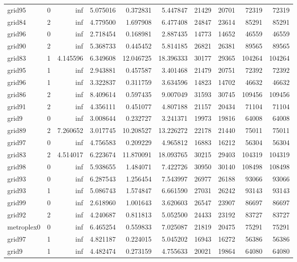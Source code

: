 \begin{longtable}{|l|r|r|r|r|r|r|r|r|r|}
grid95 & 0 & inf & 5.075016 & 0.372831 & 5.447847 & 21429 & 20701 & 72319 & 72319 \\
grid84 & 2 & inf & 4.779500 & 1.697908 & 6.477408 & 24847 & 23614 & 85291 & 85291 \\
grid96 & 0 & inf & 2.718454 & 0.168981 & 2.887435 & 14773 & 14652 & 46559 & 46559 \\
grid90 & 2 & inf & 5.368733 & 0.445452 & 5.814185 & 26821 & 26381 & 89565 & 89565 \\
grid83 & 1 & 4.145596 & 6.349608 & 12.046725 & 18.396333 & 30177 & 29365 & 104264 & 104264 \\
grid95 & 1 & inf & 2.943881 & 0.457587 & 3.401468 & 21479 & 20751 & 72392 & 72392 \\
grid96 & 1 & inf & 3.322837 & 0.311759 & 3.634596 & 14823 & 14702 & 46632 & 46632 \\
grid86 & 2 & inf & 8.409614 & 0.597435 & 9.007049 & 31593 & 30745 & 109456 & 109456 \\
grid91 & 2 & inf & 4.356111 & 0.451077 & 4.807188 & 21157 & 20434 & 71104 & 71104 \\
grid9 & 0 & inf & 3.008644 & 0.232727 & 3.241371 & 19973 & 19816 & 64008 & 64008 \\
grid89 & 2 & 7.260652 & 3.017745 & 10.208527 & 13.226272 & 22178 & 21440 & 75011 & 75011 \\
grid97 & 0 & inf & 4.756583 & 0.209229 & 4.965812 & 16883 & 16212 & 56304 & 56304 \\
grid83 & 2 & 4.514017 & 6.223674 & 11.870091 & 18.093765 & 30215 & 29403 & 104319 & 104319 \\
grid98 & 0 & inf & 5.938655 & 1.484071 & 7.422726 & 30950 & 30140 & 108498 & 108498 \\
grid93 & 0 & inf & 6.287543 & 1.256454 & 7.543997 & 26977 & 26188 & 93066 & 93066 \\
grid93 & 1 & inf & 5.086743 & 1.574847 & 6.661590 & 27031 & 26242 & 93143 & 93143 \\
grid99 & 0 & inf & 2.618960 & 1.001643 & 3.620603 & 26547 & 23907 & 86697 & 86697 \\
grid92 & 2 & inf & 4.240687 & 0.811813 & 5.052500 & 24433 & 23192 & 83727 & 83727 \\
metroplex0 & 0 & inf & 6.465254 & 0.559833 & 7.025087 & 21819 & 20475 & 75291 & 75291 \\
grid97 & 1 & inf & 4.821187 & 0.224015 & 5.045202 & 16943 & 16272 & 56386 & 56386 \\
grid9 & 1 & inf & 4.482474 & 0.273159 & 4.755633 & 20021 & 19864 & 64080 & 64080 \\

\end{longtable}
